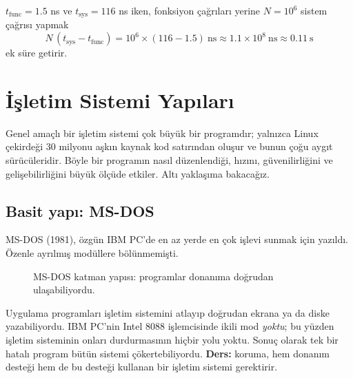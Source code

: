 \documentclass[11pt,a4paper]{article}
\begin{document}
\begin{example}
$t_{\text{func}} = 1.5$ ns ve $t_{\text{sys}} = 116$ ns iken, fonksiyon çağrıları yerine $N = 10^{6}$ sistem çağrısı yapmak
\[
N\,(t_{\text{sys}} - t_{\text{func}}) = 10^{6} \times (116 - 1.5)\ \text{ns} \approx 1.1\times10^{8}\ \text{ns} \approx 0.11\ \text{s}
\]
ek süre getirir.
\end{example}

\section{İşletim Sistemi Yapıları}
\label{sec:structures}

Genel amaçlı bir işletim sistemi çok büyük bir programdır; yalnızca Linux çekirdeği $30$ milyonu aşkın kaynak kod satırından oluşur ve bunun çoğu aygıt sürücüleridir. Böyle bir programın nasıl düzenlendiği, hızını, güvenilirliğini ve gelişebilirliğini büyük ölçüde etkiler. Altı yaklaşıma bakacağız.

\subsection{Basit yapı: MS-DOS}
\label{sec:simple}

MS-DOS (1981), özgün IBM PC'de en az yerde en çok işlevi sunmak için yazıldı. Özenle ayrılmış modüllere bölünmemişti.

\begin{figure}[H]
\centering
{}
\caption{MS-DOS katman yapısı: programlar donanıma doğrudan ulaşabiliyordu.}
\end{figure}

Uygulama programları işletim sistemini atlayıp doğrudan ekrana ya da diske yazabiliyordu. IBM PC'nin Intel 8088 işlemcisinde ikili mod \emph{yoktu}; bu yüzden işletim sisteminin onları durdurmasının hiçbir yolu yoktu. Sonuç olarak tek bir hatalı program bütün sistemi çökertebiliyordu. \textbf{Ders:} koruma, hem donanım desteği hem de bu desteği kullanan bir işletim sistemi gerektirir.
\end{document}
